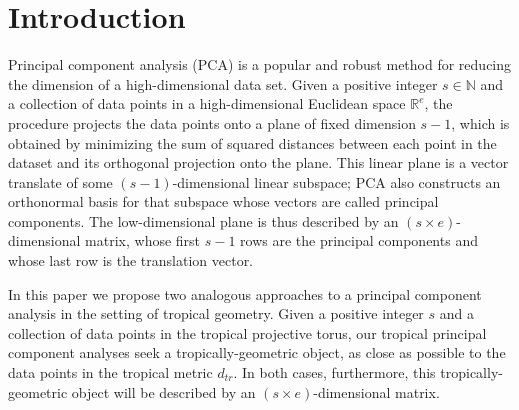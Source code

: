 \documentclass[12pt]{extarticle}
\numberwithin{theorem}{section}
\begin{document}
\section{Introduction}
Principal component analysis (PCA) is a popular and robust method for reducing the
dimension of a high-dimensional data set. 
Given a positive integer $s\in \mathbb N$ and a collection of data points in a high-dimensional Euclidean space $\mathbb R^e$, the procedure projects the data points onto a plane of fixed dimension $s-1$, which is obtained by minimizing the sum of squared distances between
each point in the dataset and its orthogonal projection onto the
plane.  %
This linear plane is a vector translate of some $(s-1)$-dimensional linear subspace; PCA also constructs an orthonormal basis for that subspace whose vectors are called principal
  components. The low-dimensional plane is thus described by an $(s\times e)$-dimensional matrix, whose first $s-1$ rows are the principal components and whose last row is the translation vector.

In this paper we propose two analogous approaches to a principal component analysis in the setting of tropical geometry. Given a positive integer $s$ and a collection of data points in the tropical projective torus, our tropical principal component analyses seek a tropically-geometric object, as close as possible to the data points in the tropical metric $d_{tr}$. In both cases, furthermore, this tropically-geometric object will be described by an $(s\times e)$-dimensional matrix. 
\end{document}
